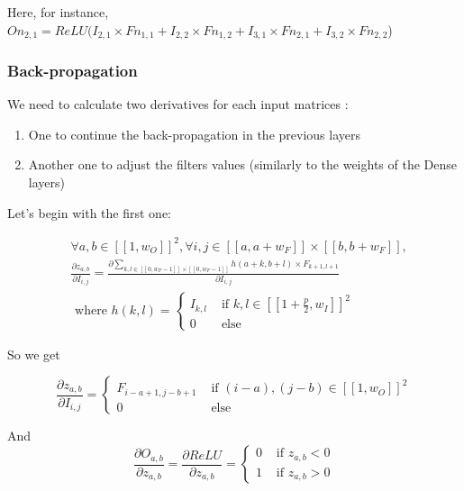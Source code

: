 \documentclass[11pt,a4paper]{report}
\begin{document}
Here, for instance, $On_{2,1} = ReLU(I_{2,1} \times Fn_{1,1} + I_{2,2} \times Fn_{1,2} + I_{3,1} \times Fn_{2,1} + I_{3,2} \times Fn_{2,2}$)


\subsubsection{Back-propagation}

We need to calculate two derivatives for each input matrices :

\begin{enumerate}
    \item One to continue the back-propagation in the previous layers
    \item Another one to adjust the filters values (similarly to the weights of the Dense layers)
\end{enumerate}

Let's begin with the first one: 

\begin{equation}
\begin{split}
    &\forall a,b \in [\![1,w_O]\!]^2, \forall i,j \in [\![a,a+w_F]\!] \times [\![b,b+w_F]\!],\\
    &\frac{\partial z_{a,b}}{\partial I_{i,j}} = \frac{\partial \sum\limits_{k,l \in [\![0,w_F-1]\!] \times [\![0,w_F-1]\!]} h(a+k,b+l)\times F_{k+1,l+1}}{\partial I_{i,j}} \\
    &\text{ where } h(k,l) = \begin{cases}
        I_{k,l} &\text{ if } k,l \in [\![1+\frac{p}{2},w_I]\!]^2\\
        0 &\text{ else}
    \end{cases}
\end{split}
\end{equation}

So we get

\begin{equation}
    \frac{\partial z_{a,b}}{\partial I_{i,j}} = \begin{cases}
        F_{i-a+1,j-b+1} &\text{ if } (i-a),(j-b) \in [\![1,w_O]\!]^2 \\
        0 &\text{ else}
    \end{cases}
\end{equation}

And 
\begin{equation}
\frac{\partial O_{a,b}}{\partial z_{a,b}} = \frac{\partial ReLU}{\partial z_{a,b}} = \begin{cases}
    0 & \text{ if } z_{a,b} < 0\\
    1 & \text{ if } z_{a,b} > 0
\end{cases}
\end{equation}
\end{document}
